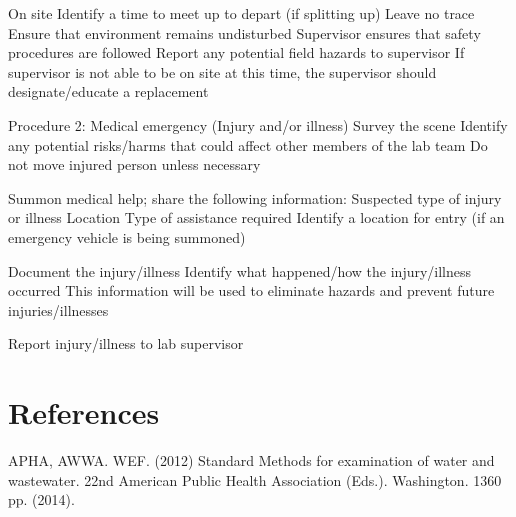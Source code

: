 \documentclass[12pt]{../SOP2}
\begin{document}
On site
Identify a time to meet up to depart (if splitting up)
Leave no trace
Ensure that environment remains undisturbed
Supervisor ensures that safety procedures are followed
Report any potential field hazards to supervisor
If supervisor is not able to be on site at this time, the supervisor should designate/educate a replacement

Procedure 2: Medical emergency (Injury and/or illness)
Survey the scene
Identify any potential risks/harms that could affect other members of the lab team
Do not move injured person unless necessary

Summon medical help; share the following information:
Suspected type of injury or illness
Location
Type of assistance required
Identify a location for entry (if an emergency vehicle is being summoned)

Document the injury/illness
Identify what happened/how the injury/illness occurred
This information will be used to eliminate hazards and prevent future injuries/illnesses

Report injury/illness to lab supervisor


\section{References}

\NP APHA, AWWA. WEF. (2012) Standard Methods for examination of water and wastewater. 22nd American Public Health Association (Eds.). Washington. 1360 pp. (2014).
\end{document}
